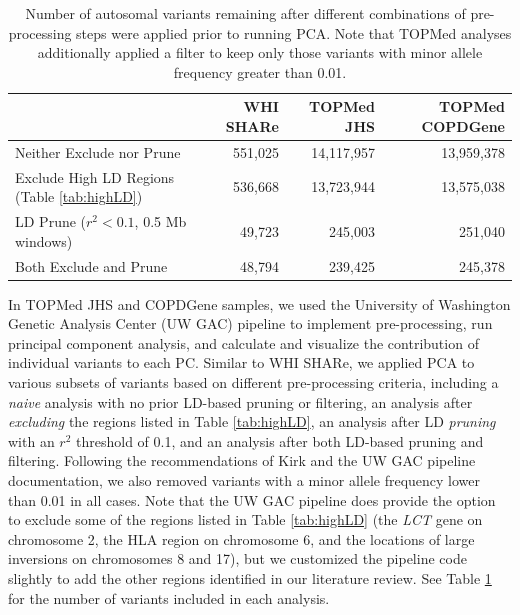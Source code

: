 \documentclass[12pt]{article}
\begin{document}
\begin{table}
\small
\begin{tabular}{|l|rrr|}
\hline
 & WHI SHARe & TOPMed JHS & TOPMed COPDGene \\
\hline
Neither Exclude nor Prune & 551,025 & 14,117,957 & 13,959,378 \\
Exclude High LD Regions (Table \ref{tab:highLD}) & 536,668 & 13,723,944 & 13,575,038  \\
LD Prune ($r^2 < 0.1$, 0.5 Mb windows) & 49,723  &  245,003 & 251,040  \\
Both Exclude and Prune & 48,794 & 239,425  & 245,378  \\
\hline
\end{tabular}
\caption{Number of autosomal variants remaining after different combinations of pre-processing steps were applied prior to running PCA. Note that TOPMed analyses additionally applied a filter to keep only those variants with minor allele frequency greater than 0.01.} 
\label{tab:preprocessN}
\end{table}

In TOPMed JHS and COPDGene samples, we used the University of Washington Genetic Analysis Center (UW GAC) pipeline to implement pre-processing, run principal component analysis, and calculate and visualize the contribution of individual variants to each PC. 
Similar to WHI SHARe, we applied PCA to various subsets of variants based on different pre-processing criteria, including a \textit{naive} analysis with no prior LD-based pruning or filtering, an analysis after \textit{excluding} the regions listed in Table \ref{tab:highLD}, an analysis after LD \textit{pruning} with an $r^2$ threshold of 0.1, and an analysis after both LD-based pruning and filtering.
Following the recommendations of Kirk \citep{JKdissertation} and the UW GAC pipeline documentation, we also removed variants with a minor allele frequency lower than 0.01 in all cases.
Note that the UW GAC pipeline does provide the option to exclude some of the regions listed in Table \ref{tab:highLD} (the \textit{LCT} gene on chromosome 2, the HLA region on chromosome 6, and the locations of large inversions on chromosomes 8 and 17), but we customized the pipeline code slightly to add the other regions identified in our literature review. 
See Table \ref{tab:preprocessN} for the number of variants included in each analysis.

\end{document}
